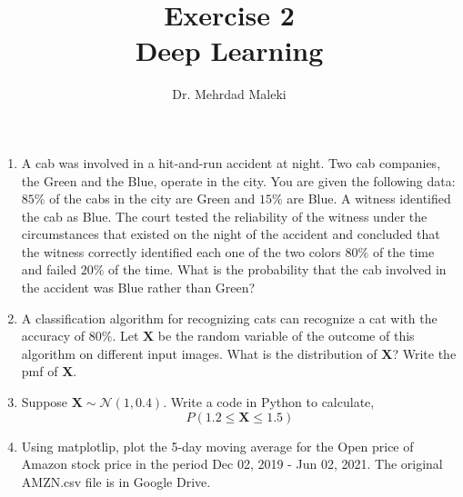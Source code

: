 \documentclass[12pt,a4paper]{article} %
\title{Exercise 2\\ Deep Learning}
\author{Dr. Mehrdad Maleki}
\date{}
\begin{document}
\maketitle
\begin{enumerate}

\item A cab was involved in a hit-and-run accident at night. Two cab companies, the Green and the Blue, operate in the city. You are given the following data: $85\%$ of the cabs in the city are Green and $15\%$ are Blue. A witness identified the cab as Blue. The court tested the reliability of the witness under the circumstances that existed on the night of the accident and concluded that the witness correctly identified each one of the two colors $80\%$ of the time and failed $20\%$ of the time. What is the probability that the cab involved in the accident was Blue rather than Green?

\item A classification algorithm for recognizing cats can recognize a cat with the accuracy of $80 \%$. Let $\mathbf{X}$ be the random variable of the outcome of this algorithm on different input images. What is the distribution of $\mathbf{X}$? Write the pmf of $\mathbf{X}$.

\item Suppose $\mathbf{X}\sim \mathcal{N}(1,0.4)$. Write a code in Python to calculate,
\[
P(1.2\leq \mathbf{X} \leq 1.5)
\]

\item Using matplotlip,  plot the 5-day moving average for the Open price of Amazon stock price in the period Dec 02, 2019 - Jun 02, 2021. The original AMZN.csv file is in Google Drive.
\end{enumerate}
\end{document}

